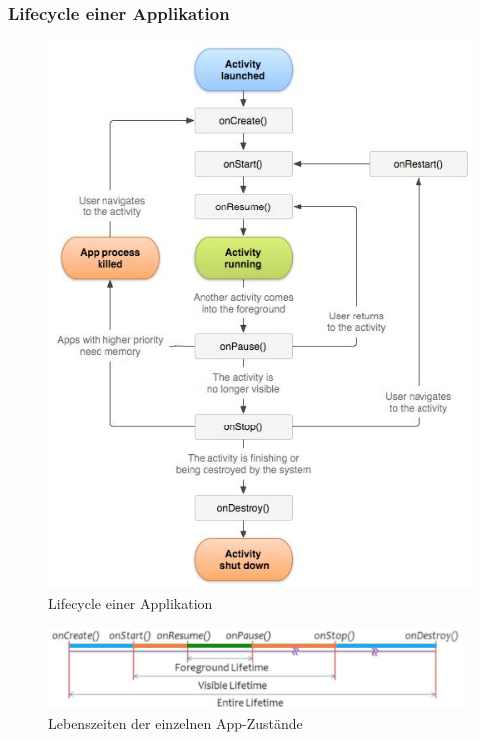 \documentclass[a4paper]{article}
\begin{document}
\subsubsection{Lifecycle einer Applikation}
\begin{figure}[h!]
	\centering
	\includegraphics[width=13cm]{img/lifecycle.jpg}
	\caption{Lifecycle einer Applikation}
	\label{fig:lifecycle}
\end{figure}
\begin{figure}[h!]
	\centering
	\includegraphics[width=11cm]{img/lifetime.jpg}
	\caption{Lebenszeiten der einzelnen App-Zustände}
	\label{fig:lifetime}
\end{figure}
\newpage
\end{document}
